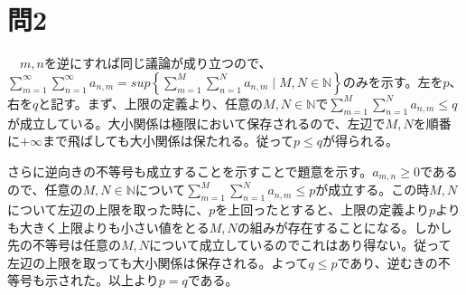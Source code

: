 \documentclass{article}
\begin{document}
\section{問2}
　$m, n$を逆にすれば同じ議論が成り立つので、$\sum_{m=1}^{\infty} \sum_{n = 1}^{\infty} a_{n,m} = sup\left\{ \sum_{m=1}^{M} \sum_{n = 1}^{N} a_{n,m} \mid M, N \in \mathbb{N}\right\}$のみを示す。左を$p$、右を$q$と記す。まず、上限の定義より、任意の$M, N \in \mathbb{N}$で$\sum_{m=1}^{M} \sum_{n = 1}^{N} a_{n,m} \leq q$が成立している。大小関係は極限において保存されるので、左辺で$M, N$を順番に$+\infty$まで飛ばしても大小関係は保たれる。従って$p \leq q$が得られる。

さらに逆向きの不等号も成立することを示すことで題意を示す。$a_{m,n} \geq 0$であるので、任意の$M, N \in \mathbb{N}$について$\sum_{m=1}^{M} \sum_{n = 1}^{N} a_{n,m} \leq p$が成立する。この時$M, N$について左辺の上限を取った時に、$p$を上回ったとすると、上限の定義より$p$よりも大きく上限よりも小さい値をとる$M, N$の組みが存在することになる。しかし先の不等号は任意の$M, N$について成立しているのでこれはあり得ない。従って左辺の上限を取っても大小関係は保存される。よって$q \leq p$であり、逆むきの不等号も示された。以上より$p = q$である。
\end{document}
